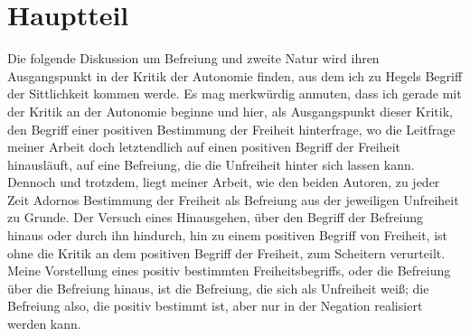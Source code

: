 \documentclass[12pt, a4paper, openany]{report}
\begin{document}
\chapter{Hauptteil}
Die folgende Diskussion um Befreiung und zweite Natur wird ihren Ausgangspunkt in der Kritik der Autonomie finden, aus dem ich zu Hegels Begriff der Sittlichkeit kommen werde. 
Es mag merkwürdig anmuten, dass ich gerade mit der Kritik an der Autonomie beginne und hier, als Ausgangspunkt dieser Kritik, den Begriff einer positiven Bestimmung der Freiheit hinterfrage,
wo die Leitfrage meiner Arbeit doch letztendlich auf einen positiven Begriff der Freiheit hinausläuft, auf eine Befreiung, die die Unfreiheit hinter sich lassen kann.
Dennoch und trotzdem, liegt meiner Arbeit, wie den beiden Autoren, zu jeder Zeit Adornos Bestimmung der Freiheit als Befreiung aus der jeweiligen Unfreiheit zu Grunde.
Der Versuch eines Hinausgehen, über den Begriff der Befreiung hinaus oder durch ihn hindurch, hin zu einem positiven Begriff von Freiheit, ist ohne die Kritik an dem positiven Begriff der Freiheit, zum Scheitern verurteilt.
Meine Vorstellung eines positiv bestimmten Freiheitsbegriffs, oder die Befreiung über die Befreiung hinaus, ist die Befreiung, die sich als Unfreiheit weiß; die Befreiung also, die positiv bestimmt ist, aber nur in der Negation realisiert werden kann. 
\end{document}
